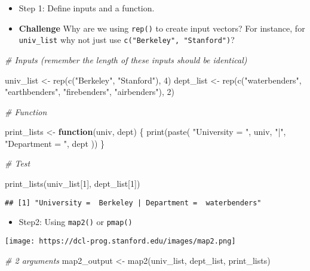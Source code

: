 \documentclass[
]{book}
\newenvironment{Shaded}{\begin{snugshade}}{\end{snugshade}}
\newcommand{\CommentTok}[1]{\textcolor[rgb]{0.56,0.35,0.01}{\textit{#1}}}
\newcommand{\ControlFlowTok}[1]{\textcolor[rgb]{0.13,0.29,0.53}{\textbf{#1}}}
\newcommand{\DecValTok}[1]{\textcolor[rgb]{0.00,0.00,0.81}{#1}}
\newcommand{\FunctionTok}[1]{\textcolor[rgb]{0.00,0.00,0.00}{#1}}
\newcommand{\NormalTok}[1]{#1}
\newcommand{\OtherTok}[1]{\textcolor[rgb]{0.56,0.35,0.01}{#1}}
\newcommand{\StringTok}[1]{\textcolor[rgb]{0.31,0.60,0.02}{#1}}
\providecommand{\tightlist}{%
  \setlength{\itemsep}{0pt}\setlength{\parskip}{0pt}}
\begin{document}
\begin{itemize}
\item
  Step 1: Define inputs and a function.
\item
  \textbf{Challenge} Why are we using \texttt{rep()} to create input vectors? For instance, for \texttt{univ\_list} why not just use \texttt{c("Berkeley",\ "Stanford")}?
\end{itemize}

\begin{Shaded}
\begin{Highlighting}[]
\CommentTok{\# Inputs (remember the length of these inputs should be identical)}

\NormalTok{univ\_list }\OtherTok{\textless{}{-}} \FunctionTok{rep}\NormalTok{(}\FunctionTok{c}\NormalTok{(}\StringTok{"Berkeley"}\NormalTok{, }\StringTok{"Stanford"}\NormalTok{), }\DecValTok{4}\NormalTok{)}
\NormalTok{dept\_list }\OtherTok{\textless{}{-}} \FunctionTok{rep}\NormalTok{(}\FunctionTok{c}\NormalTok{(}\StringTok{"waterbenders"}\NormalTok{, }\StringTok{"earthbenders"}\NormalTok{, }\StringTok{"firebenders"}\NormalTok{, }\StringTok{"airbenders"}\NormalTok{), }\DecValTok{2}\NormalTok{)}

\CommentTok{\# Function}

\NormalTok{print\_lists }\OtherTok{\textless{}{-}} \ControlFlowTok{function}\NormalTok{(univ, dept) \{}
  \FunctionTok{print}\NormalTok{(}\FunctionTok{paste}\NormalTok{(}
    \StringTok{"University = "}\NormalTok{, univ, }\StringTok{"|"}\NormalTok{,}
    \StringTok{"Department = "}\NormalTok{, dept}
\NormalTok{  ))}
\NormalTok{\}}

\CommentTok{\# Test}

\FunctionTok{print\_lists}\NormalTok{(univ\_list[}\DecValTok{1}\NormalTok{], dept\_list[}\DecValTok{1}\NormalTok{])}
\end{Highlighting}
\end{Shaded}

\begin{verbatim}
## [1] "University =  Berkeley | Department =  waterbenders"
\end{verbatim}

\begin{itemize}
\tightlist
\item
  Step2: Using \texttt{map2()} or \texttt{pmap()}
\end{itemize}

\texttt{[image: https://dcl-prog.stanford.edu/images/map2.png]}

\begin{Shaded}
\begin{Highlighting}[]
\CommentTok{\# 2 arguments}
\NormalTok{map2\_output }\OtherTok{\textless{}{-}} \FunctionTok{map2}\NormalTok{(univ\_list, dept\_list, print\_lists)}
\end{Highlighting}
\end{Shaded}
\end{document}
